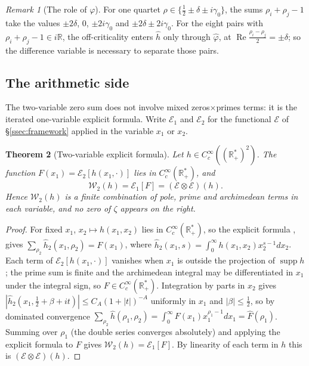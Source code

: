 \documentclass[11pt]{amsart}
\newtheorem{theorem}{Theorem}[section]
\theoremstyle{definition}
\theoremstyle{remark}
\newtheorem{remark}[theorem]{Remark}
\newcommand{\bbR}{\mathbb{R}}
\newcommand{\Rp}{\bbR_+^*}
\newcommand{\Wtwo}{\mathcal{W}_2}
\newcommand{\Ecal}{\mathcal{E}}
\DeclareMathOperator{\Real}{Re}
\begin{document}
\begin{remark}[The role of $\varphi$]
For one quartet $\rho\in\{\tfrac12\pm\delta\pm i\gamma_0\}$, the sums $\rho_i+\rho_j-1$ take the
values $\pm2\delta$, $0$, $\pm2i\gamma_0$ and $\pm2\delta\pm2i\gamma_0$. For the eight pairs
with $\rho_i+\rho_j-1\in i\bbR$, the off-criticality enters $\hat h$ only through $\hat\varphi$,
at $\Real\tfrac{\rho_i-\rho_j}{2}=\pm\delta$; so the difference variable is necessary to separate
those pairs.
\end{remark}

\subsection{The arithmetic side}
The two-variable zero sum does not involve mixed zeros$\times$primes terms: it is the iterated
one-variable explicit formula. Write $\Ecal_1$ and $\Ecal_2$ for the functional $\Ecal$ of
\S\ref{ssec:framework} applied in the variable $x_1$ or $x_2$.

\begin{theorem}[Two-variable explicit formula]\label{thm:mixed}
Let $h\in C_c^\infty((\Rp)^2)$. The function $F(x_1)=\Ecal_2[h(x_1,\cdot)]$ lies
in $C_c^\infty(\Rp)$, and
\[
\Wtwo(h)=\Ecal_1[F]=(\Ecal\otimes\Ecal)(h).
\]
Hence $\Wtwo(h)$ is a finite combination of pole, prime and archimedean terms in each variable,
and no zero of $\zeta$ appears on the right.
\end{theorem}

\begin{proof}
For fixed $x_1$, $x_2\mapsto h(x_1,x_2)$ lies in $C_c^\infty(\Rp)$, so the explicit formula
\cite{Weil52}, \cite[Def.~2.1]{P25} gives $\sum_{\rho_2}\hat h_2(x_1,\rho_2)=F(x_1)$, where
$\hat h_2(x_1,s)=\int_0^\infty h(x_1,x_2)x_2^{s-1}dx_2$. Each term of $\Ecal_2[h(x_1,\cdot)]$
vanishes when $x_1$ is outside the projection of $\operatorname{supp}h$; the prime sum is finite
and the archimedean integral may be differentiated in $x_1$ under the integral sign, so
$F\in C_c^\infty(\Rp)$. Integration by parts in $x_2$ gives
$|\hat h_2(x_1,\tfrac12+\beta+it)|\le C_A(1+|t|)^{-A}$ uniformly in $x_1$ and $|\beta|\le\tfrac12$,
so by dominated convergence
$\sum_{\rho_2}\hat h(\rho_1,\rho_2)=\int_0^\infty F(x_1)x_1^{\rho_1-1}dx_1=\hat F(\rho_1)$. Summing
over $\rho_1$ (the double series converges absolutely) and applying the explicit formula to
$F$ gives $\Wtwo(h)=\Ecal_1[F]$. By linearity of each term in $h$ this is
$(\Ecal\otimes\Ecal)(h)$.
\end{proof}
\end{document}
